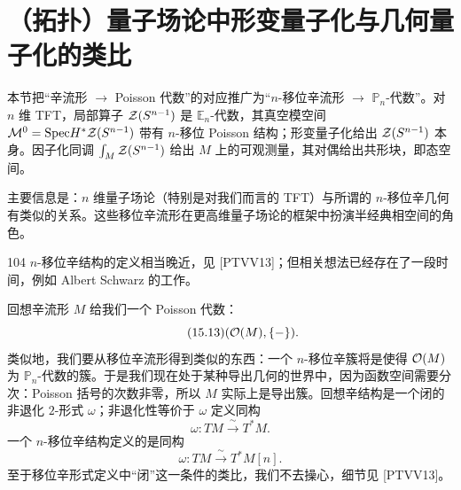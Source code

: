 \section{（拓扑）量子场论中形变量子化与几何量子化的类比}
\begin{sectionkey}
本节把“辛流形 $\to$ Poisson 代数”的对应推广为“$n$-移位辛流形 $\to$ $\mathbb{P}_n$-代数”。对 $n$ 维 TFT，局部算子 $\mathcal{Z}(S^{n-1})$ 是 $\mathbb{E}_n$-代数，其真空模空间 $\mathcal{M}^0=\mathrm{Spec} H^*\mathcal{Z}(S^{n-1})$ 带有 $n$-移位 Poisson 结构；形变量子化给出 $\mathcal{Z}(S^{n-1})$ 本身。因子化同调 $\int_M\mathcal{Z}(S^{n-1})$ 给出 $M$ 上的可观测量，其对偶给出共形块，即态空间。
\end{sectionkey}

主要信息是：$n$ 维量子场论（特别是对我们而言的 TFT）与所谓的 $n$-移位辛几何有类似的关系。这些移位辛流形在更高维量子场论的框架中扮演半经典相空间的角色。

\begin{srcrem}{104}
$n$-移位辛结构的定义相当晚近，见 [PTVV13]；但相关想法已经存在了一段时间，例如 Albert Schwarz 的工作。%
\end{srcrem}

回想辛流形 $M$ 给我们一个 Poisson 代数：
\begin{equation}\tag{15.13}
(\mathcal{O}(M),\{-\}).
\end{equation}
类似地，我们要从移位辛流形得到类似的东西：一个 $n$-移位辛簇将是使得 $\mathcal{O}(M)$ 为 $\mathbb{P}_n$-代数的簇。于是我们现在处于某种导出几何的世界中，因为函数空间需要分次：Poisson 括号的次数非零，所以 $M$ 实际上是导出簇。回想辛结构是一个闭的非退化 $2$-形式 $\omega$；非退化性等价于 $\omega$ 定义同构
\begin{equation}\tag{15.14}
\omega:TM\xrightarrow{\ \sim\ }T^*M.
\end{equation}
一个 $n$-移位辛结构定义的是同构
\begin{equation}\tag{15.15}
\omega:TM\xrightarrow{\ \sim\ }T^*M[n].
\end{equation}
至于移位辛形式定义中“闭”这一条件的类比，我们不去操心，细节见 [PTVV13]。%

